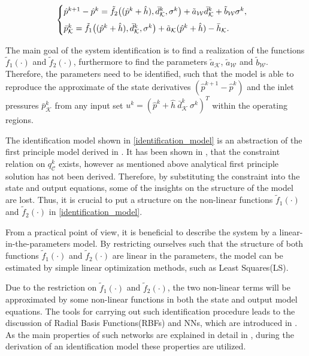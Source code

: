 \begin{equation}
\begin{cases}
  \label{identification_model}
    \hat{p}^{k+1} - \hat{p}^{k} = \tilde{f}_2 \big((\hat{p}^{k} + \hat{h}),\bar{d}^{k}_{\mathcal{K}}, \sigma^{k}\big) + \tilde{a}_{\mathcal{W}} \bar{d}^{k}_{\mathcal{K}} + \tilde{b}_{\mathcal{W}} \sigma^{k},\vspace{2mm}\\ 
  \bar{p}^{k}_{\mathcal{K}}  = \tilde{f}_1 \big((\hat{p}^{k} + \hat{h}),\bar{d}^{k}_{\mathcal{K}}, \sigma^{k}\big) + \tilde{a}_{\mathcal{K}} (\hat{p}^{k} + \hat{h}) - \bar{h}_{\mathcal{K}}.
  \end{cases}
\end{equation} 

The main goal of the system identification is to find a realization of the functions $\tilde{f}_1(\cdot)$ and $\tilde{f}_2(\cdot)$, furthermore to find the parameters $\tilde{a}_{\mathcal{K}}$, $\tilde{a}_{\mathcal{W}}$ and $\tilde{b}_{\mathcal{W}}$. Therefore, the parameters need to be identified, such that the model is able to reproduce the approximate of the state derivatives $(\hat{p}^{k+1} \! - \! \hat{p}^{k})$ and the inlet pressures $\bar{p}^{k}_{\mathcal{K}}$ from any input set $u^k = ( \hat{p}^{k}\! + \!\hat{h} \ \bar{d}^{k}_{\mathcal{K}} \ \sigma^{k} )^T$ within the operating regions.

The identification model shown in \eqref{identification_model} is an abstraction of the first principle model derived in . It has been shown in \cite{oneinput_paper}, that the constraint relation on $q^{k}_{\mathcal{C}}$ exists, however as mentioned above analytical first principle solution has not been derived. Therefore, by substituting the constraint into the state and output equations, some of the insights on the structure of the model are lost. Thus, it is crucial to put a structure on the non-linear functions $\tilde{f}_1(\cdot)$ and $\tilde{f}_2(\cdot)$ in \eqref{identification_model}. 

From a practical point of view, it is beneficial to describe the system by a linear-in-the-parameters model. By restricting ourselves such that the structure of both functions $\tilde{f}_1(\cdot)$ and $\tilde{f}_2(\cdot)$ are linear in the parameters, the model can be estimated by simple linear optimization methods, such as Least Squares(LS). 

Due to the restriction on $\tilde{f}_1(\cdot)$ and $\tilde{f}_2(\cdot)$, the two non-linear terms will be approximated by some non-linear functions in both the state and output model equations. The tools for carrying out such identification procedure leads to the discussion of Radial Basis Functions(RBFs) and NNs, which are introduced in . As the main properties of such networks are explained in detail in , during the derivation of an identification model these properties are utilized. 

